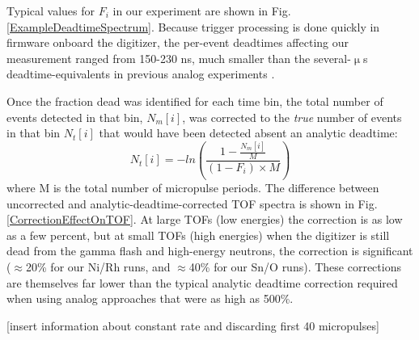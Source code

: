 \documentclass[twocolumn,secnumarabic,amssymb, nobibnotes, aps, prl,
superscriptaddress, nobalancelastpage]{revtex4}
\begin{document}
Typical values for $F_{i}$ in our experiment are shown in Fig.
\ref{ExampleDeadtimeSpectrum}. Because trigger processing is done quickly in
firmware onboard the digitizer, the per-event deadtimes affecting our
measurement ranged from 150-230 ns, much smaller than the several-$\upmu$s
deadtime-equivalents in previous analog experiments \cite{Finlay1993,
Abfalterer2001}.

Once the fraction dead was identified for each time bin, the total number of
events detected in that bin, $N_{m}[i]$, was corrected to the \textit{true}
number of events in that bin $N_{t}[i]$ that would have been detected absent an
analytic deadtime:
\begin{equation}
    N_{t}[i] = -ln\left(\frac{1-\frac{N_m[i]}{M}}{(1-F_{i})\times M}\right)
\end{equation}
where M is the total number of micropulse periods. The difference between
uncorrected and analytic-deadtime-corrected TOF spectra is shown in Fig.
\ref{CorrectionEffectOnTOF}. At large TOFs (low energies) the correction is as low as a
few percent, but at small TOFs (high energies) when the digitizer is still dead
from the gamma flash and high-energy neutrons, the correction is significant
($\approx$20\% for our Ni/Rh runs, and $\approx$40\% for our Sn/O runs). These 
corrections are themselves far lower than the typical
analytic deadtime correction required when using analog approaches \cite{Finlay1993,
Abfalterer2001} that were as high as 500\%.%

[insert information about constant rate and discarding first 40 micropulses]
\end{document}
